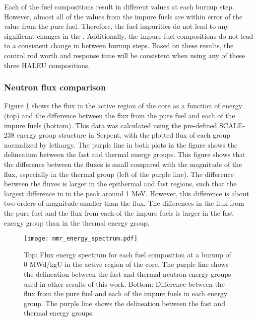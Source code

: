 Each of the fuel compositions result in different \betaEff values at 
each burnup step. However, almost all of the values from the impure 
fuels are within error of the value from the pure fuel. Therefore, the 
fuel impurities do not lead to any significant changes in the 
\betaEff. Additionally, the impure fuel compositions do not lead to 
a consistent change in \betaEff between burnup steps. Based on 
these results, the control rod worth and response time will be 
consistent when using any of these three \gls{HALEU} compositions.

\subsubsection{Neutron flux comparison}

Figure \ref{fig:mmr_energy_spectrum} shows the flux in the active 
region of the core as a function of energy (top) and the difference between 
the flux from the pure fuel and each of the impure fuels (bottom). This 
data was 
calculated using the pre-defined SCALE-238 energy group structure in Serpent,
with the plotted flux of each group normalized by lethargy. The purple 
line in both plots in the figure shows the delineation between the fast and 
thermal energy groups. This figure shows that the difference between 
the fluxes is small compared with the magnitude of the flux, especially in 
the thermal group (left of the purple line). The difference between the 
fluxes is larger in the epithermal and fast regions, such that the largest 
difference in 
in the peak around 1 MeV. However, this difference is about two orders 
of magnitude smaller than the flux. The differences 
in the flux from the pure fuel and the flux from each of the impure 
fuels is larger in the fast energy group than in the thermal energy group.

\begin{figure}
        \centering
        \texttt{[image: mmr\_energy\_spectrum.pdf]}
        \caption{Top: Flux energy spectrum for each fuel composition at a 
        burnup of 0 MWd/kgU in the active region of the core. The 
        purple line shows the delineation between the fast and thermal 
        neutron energy groups used in other results of this work.
        Bottom: Difference between the flux from the pure fuel and each 
        of the impure fuels in each energy group. The purple line shows the 
        delineation between the fast and thermal energy groups. }
        \label{fig:mmr_energy_spectrum}
\end{figure}

